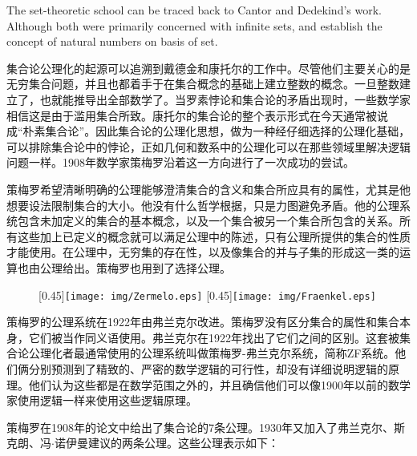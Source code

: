 \documentclass{article}
\begin{document}
The set-theoretic school can be traced back to Cantor and Dedekind's work. Although both were primarily concerned with infinite sets, and establish the concept of natural numbers on basis of set.

集合论公理化的起源可以追溯到戴德金和康托尔的工作中。尽管他们主要关心的是无穷集合问题，并且也都着手于在集合概念的基础上建立整数的概念。一旦整数建立了，也就能推导出全部数学了。当罗素悖论和集合论的矛盾出现时，一些数学家相信这是由于滥用集合所致。康托尔的集合论的整个表示形式在今天通常被说成“朴素集合论”。因此集合论的公理化思想，做为一种经仔细选择的公理化基础，可以排除集合论中的悖论，正如几何和数系中的公理化可以在那些领域里解决逻辑问题一样。1908年数学家策梅罗沿着这一方向进行了一次成功的尝试。

策梅罗希望清晰明确的公理能够澄清集合的含义和集合所应具有的属性，尤其是他想要设法限制集合的大小。他没有什么哲学根据，只是力图避免矛盾。他的公理系统包含未加定义的集合的基本概念，以及一个集合被另一个集合所包含的关系。所有这些加上已定义的概念就可以满足公理中的陈述，只有公理所提供的集合的性质才能使用。在公理中，无穷集的存在性，以及像集合的并与子集的形成这一类的运算也由公理给出。策梅罗也用到了选择公理。

\begin{figure}[htbp]
  \centering
  [0.45\linewidth]{\texttt{[image: img/Zermelo.eps]}} \quad
  [0.45\linewidth]{\texttt{[image: img/Fraenkel.eps]}}
  \captionsetup{labelformat=empty}
  \caption{}
  \label{fig:Zermelo-and-Fraenkel}
\end{figure}

 
策梅罗的公理系统在1922年由弗兰克尔改进。策梅罗没有区分集合的属性和集合本身，它们被当作同义语使用。弗兰克尔在1922年找出了它们之间的区别。这套被集合论公理化者最通常使用的公理系统叫做策梅罗-弗兰克尔系统，简称ZF系统。他们俩分别预测到了精致的、严密的数学逻辑的可行性，却没有详细说明逻辑的原理。他们认为这些都是在数学范围之外的，并且确信他们可以像1900年以前的数学家使用逻辑一样来使用这些逻辑原理。

策梅罗在1908年的论文中给出了集合论的7条公理。1930年又加入了弗兰克尔、斯克朗、冯$\cdot$诺伊曼建议的两条公理。这些公理表示如下：
\end{document}
